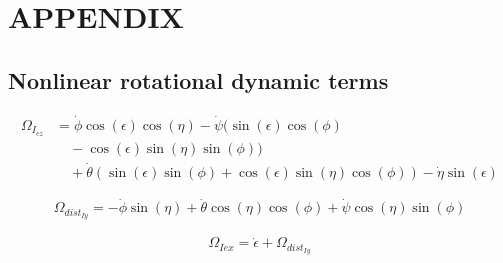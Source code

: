 \documentclass[letterpaper, 10 pt, conference]{ieeeconf}  %
\begin{document}
\section*{APPENDIX}
\subsection*{Nonlinear rotational dynamic terms}
\begin{equation}
  \begin{aligned}
    \Omega_{I_{ez}} & = \dot{\phi}\cos(\epsilon)\cos(\eta) - \dot{\psi}(\sin(\epsilon)\cos(\phi)                                   \\
                    & \quad-\cos(\epsilon)\sin(\eta)\sin(\phi))                                                                    \\
                    & \quad + \dot{\theta}(\sin(\epsilon)\sin(\phi)+\cos(\epsilon)\sin(\eta)\cos(\phi)) - \dot{\eta}\sin(\epsilon)
  \end{aligned}
\end{equation}

\begin{equation}
  \Omega_{dist_{Iy}} = -\dot \phi\sin(\eta) + \dot\theta\cos(\eta)\cos(\phi) + \dot\psi\cos(\eta)\sin(\phi)
\end{equation}

\begin{equation}
  \begin{aligned}
    \Omega_{Iex} = \dot{\epsilon} + \Omega_{dist_{Iy}}
  \end{aligned}
\end{equation}
\end{document}
